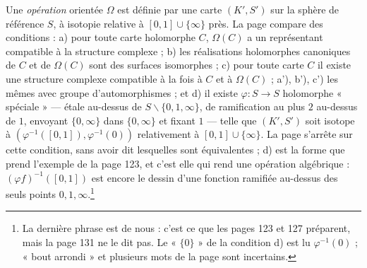 \documentclass[11pt,a4paper]{article}
\begin{document}
Une \emph{opération} orientée $\Omega$ est définie par une carte $(K', S')$ sur
la sphère de référence $S$, à isotopie relative à $[0, 1] \cup \{\infty\}$ près.
La page compare des conditions : a) pour toute carte holomorphe $C$, $\Omega(C)$
a un représentant compatible à la structure complexe ; b) les réalisations
holomorphes canoniques de $C$ et de $\Omega(C)$ sont des surfaces isomorphes ;
c) pour toute carte $C$ il existe une structure complexe compatible à la fois
à $C$ et à $\Omega(C)$ ; a'), b'), c') les mêmes avec groupe d'automorphismes ;
et d) il existe $\varphi : S \to S$ holomorphe « spéciale » --- étale au-dessus
de $S \smallsetminus \{0, 1, \infty\}$, de ramification au plus $2$ au-dessus
de $1$, envoyant $\{0, \infty\}$ dans $\{0, \infty\}$ et fixant $1$ --- telle
que $(K', S')$ soit isotope à $(\varphi^{-1}([0, 1]), \varphi^{-1}(0))$ relativement
à $[0, 1] \cup \{\infty\}$. La page s'arrête sur cette condition, sans avoir
dit lesquelles sont équivalentes ; d) est la forme que prend l'exemple de la
page 123, et c'est elle qui rend une opération algébrique : $(\varphi
f)^{-1}([0, 1])$ est encore le dessin d'une fonction ramifiée au-dessus des
seuls points $0, 1, \infty$.\footnote{La dernière phrase est de nous : c'est ce
que les pages 123 et 127 préparent, mais la page 131 ne le dit pas. Le « $\{0\}$ » de
la condition d) est lu $\varphi^{-1}(0)$ ; « bout arrondi » et plusieurs mots de
la page sont incertains.}
\end{document}

